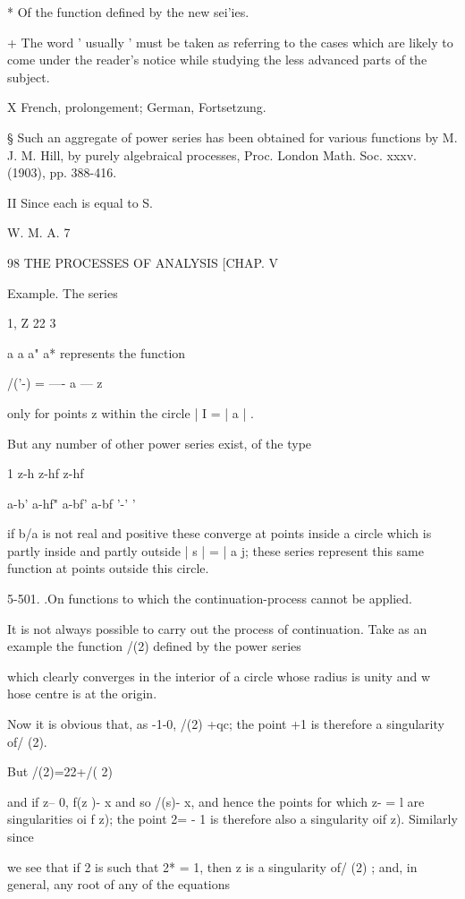 {{* Of the function defined by the new sei'ies.

+ The word ' usually ' must be taken as referring to the cases which
are likely to come under the reader's notice while studying the less
advanced parts of the subject.

X French, prolongement; German, Fortsetzung.

§ Such an aggregate of power series has been obtained for various
functions by M. J. M. Hill, by purely algebraical processes, Proc.
London Math. Soc. xxxv. (1903), pp. 388-416.

II Since each is equal to S.

W. M. A. 7

98 THE PROCESSES OF ANALYSIS [CHAP. V

Example. The series

1, Z 22 3

a a a" a* represents the function

/('-) = —- a — z

only for points z within the circle | I = | a | .

But any number of other power series exist, of the type

1 z-h z-hf z-hf

a-b' a-hf" a-bf' a-bf '-' '

if b/a is not real and positive these converge at points inside a
circle which is partly inside and partly outside | s | = | a j; these
series represent this same function at points outside this circle.

5-501. .On functions to which the continuation-process cannot be
applied.

It is not always possible to carry out the process of continuation.
Take as an example the function /(2) defined by the power series

which clearly converges in the interior of a circle whose radius is
unity and w hose centre is at the origin.

Now it is obvious that, as -1-0, /(2) +qc; the point +1 is therefore
a singularity of/ (2).

But /(2)=22+/( 2)

and if z-- 0, f(z )- x and so /(s)- x, and hence the points for which
z- = l are singularities oi f z); the point 2= - 1 is therefore also
a singularity oif z). Similarly since

we see that if 2 is such that 2* = 1, then z is a singularity of/ (2)
; and, in general, any root of any of the equations

}}

